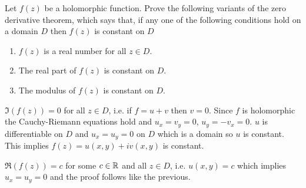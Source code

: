 \documentclass[10pt, a4paper]{article}
\begin{document}
\begin{problem}
    Let $f(z)$ be a holomorphic function.
    Prove the following variants of the zero derivative theorem,
    which says that,
    if any one of the following conditions hold on a domain $D$ then $f(z)$ is constant on $D$
    \begin{enumerate}[label = (\roman*)]
        \item $f(z)$ is a real number for all $z \in D$.

        \item The real part of $f(z)$ is constant on $D$.

        \item The modulus of $f(z)$ is constant on $D$.
    \end{enumerate}

    \begin{solution}
        $\Im(f(z)) = 0$ for all $z \in D$,
        i.e. if $f = u + v$ then $v = 0$.
        Since $f$ is holomorphic the Cauchy-Riemann equations hold and $u_x = v_y = 0$,
        $u_y = -v_x = 0$.
        $u$ is differentiable on $D$ and $u_x = u_y = 0$ on $D$ which is a domain so $u$ is constant.
        This implies $f(z) = u(x, y) + iv(x, y)$ is constant.


        $\Re(f(z)) = c$ for some $c \in \mathbb{R}$ and all $z \in D$,
        i.e. $u(x, y) = c$ which implies $u_x = u_y = 0$ and the proof follows like the previous.



\end{solution}
\end{problem}
\end{document}
